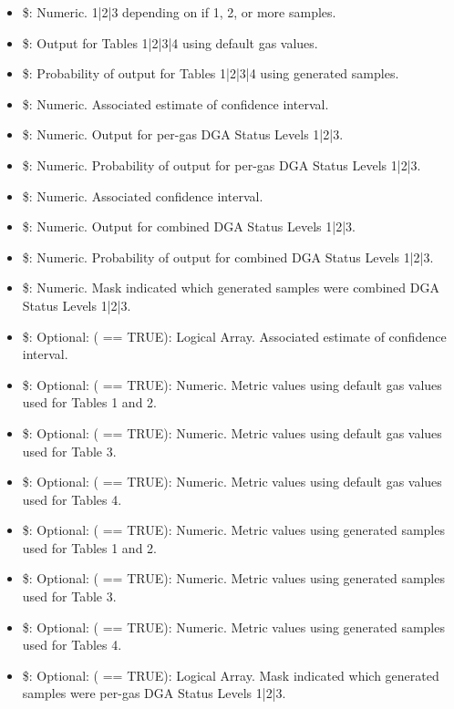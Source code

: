 \documentclass[a4paper]{book}
\begin{document}
\begin{Value}
\begin{itemize}
\begin{itemize}
\item{} \$: Numeric. 1|2|3 depending on if 1, 2, or more samples.
\item{} \$: Output for Tables 1|2|3|4 using default gas values.
\item{} \$: Probability of output for Tables 1|2|3|4 using generated samples.
\item{} \$: Numeric. Associated estimate of confidence interval.
\item{} \$: Numeric. Output for per-gas DGA Status Levels 1|2|3.
\item{} \$: Numeric. Probability of output for per-gas DGA Status Levels 1|2|3.
\item{} \$: Numeric. Associated confidence interval.
\item{} \$: Numeric. Output for combined DGA Status Levels 1|2|3.
\item{} \$: Numeric. Probability of output for combined DGA Status Levels 1|2|3.
\item{} \$: Numeric. Mask indicated which generated samples were combined DGA Status Levels 1|2|3.
\item{} \$: Optional: ( == TRUE): Logical Array. Associated estimate of confidence interval.
\item{} \$: Optional: ( == TRUE): Numeric. Metric values using default gas values used for Tables 1 and 2.
\item{} \$: Optional: ( == TRUE): Numeric. Metric values using default gas values used for Table 3.
\item{} \$: Optional: ( == TRUE): Numeric. Metric values using default gas values used for Tables 4.
\item{} \$: Optional: ( == TRUE): Numeric. Metric values using generated samples used for Tables 1 and 2.
\item{} \$: Optional: ( == TRUE): Numeric. Metric values using generated samples used for Table 3.
\item{} \$: Optional: ( == TRUE): Numeric. Metric values using generated samples used for Tables 4.
\item{} \$: Optional: ( == TRUE): Logical Array. Mask indicated which generated samples were per-gas DGA Status Levels 1|2|3.


\end{itemize}
\end{itemize}
\end{Value}
\end{document}

